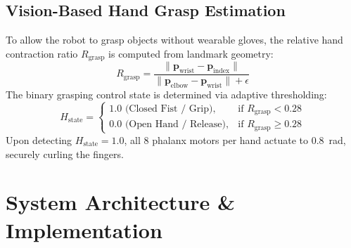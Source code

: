 \documentclass[conference,10pt,twocolumn]{IEEEtran}
\begin{document}
\subsection{Vision-Based Hand Grasp Estimation}
To allow the robot to grasp objects without wearable gloves, the relative hand contraction ratio $R_{\text{grasp}}$ is computed from landmark geometry:
\begin{equation}
R_{\text{grasp}} = \frac{\|\mathbf{p}_{\text{wrist}} - \mathbf{p}_{\text{index}}\|}{\|\mathbf{p}_{\text{elbow}} - \mathbf{p}_{\text{wrist}}\| + \epsilon}
\end{equation}
The binary grasping control state is determined via adaptive thresholding:
\begin{equation}
H_{\text{state}} = \begin{cases}
1.0 \text{ (Closed Fist / Grip)}, & \text{if } R_{\text{grasp}} < 0.28 \\
0.0 \text{ (Open Hand / Release)}, & \text{if } R_{\text{grasp}} \ge 0.28
\end{cases}
\end{equation}
Upon detecting $H_{\text{state}} = 1.0$, all 8 phalanx motors per hand actuate to $0.8$~rad, securely curling the fingers.

\section{System Architecture \& Implementation}
\end{document}
